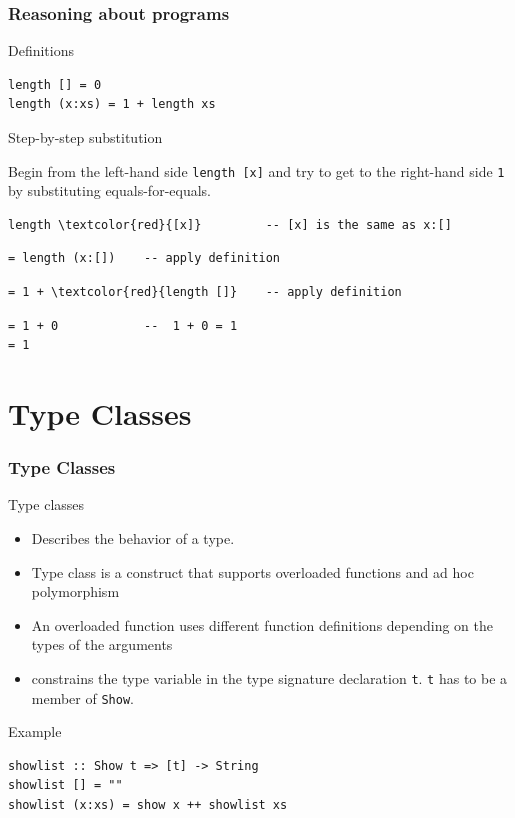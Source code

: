 \documentclass{beamer}
\begin{document}
\begin{frame}[fragile]
  \frametitle{Reasoning about programs}
  \begin{block}{Definitions}
    \begin{verbatim}
length [] = 0
length (x:xs) = 1 + length xs  
\end{verbatim}
  \end{block}
  \begin{block}{Step-by-step substitution}
    

Begin from the left-hand side \verb|length [x]| and try to get to the right-hand side \verb|1| by substituting equals-for-equals.

\begin{Verbatim}[commandchars=\\\{\}]
length \textcolor{red}{[x]}         -- [x] is the same as x:[]
\end{Verbatim}
\pause
\begin{verbatim}
= length (x:[])    -- apply definition
\end{verbatim}
\pause
\begin{Verbatim}[commandchars=\\\{\}]
= 1 + \textcolor{red}{length []}    -- apply definition
\end{Verbatim}
\pause
\begin{verbatim}
= 1 + 0            --  1 + 0 = 1
= 1
\end{verbatim}
  \end{block}
\end{frame}

\section{Type Classes}

\begin{frame}[fragile]
\frametitle{Type Classes}
  \begin{block}{Type classes}
    \begin{itemize}
   \item Describes the behavior of a type.
    \item  Type class is a construct that supports overloaded functions and ad hoc polymorphism
  \item An overloaded function uses different function definitions depending on the types of the arguments
  \item constrains the type variable in the type signature declaration \verb|t|. \verb|t| has to be a member of \verb|Show|.
  \end{itemize}
\end{block}
\begin{block}{Example}
\begin{Verbatim}
showlist :: Show t => [t] -> String
showlist [] = ""
showlist (x:xs) = show x ++ showlist xs
\end{Verbatim}

\end{block}
\end{frame}
\end{document}
